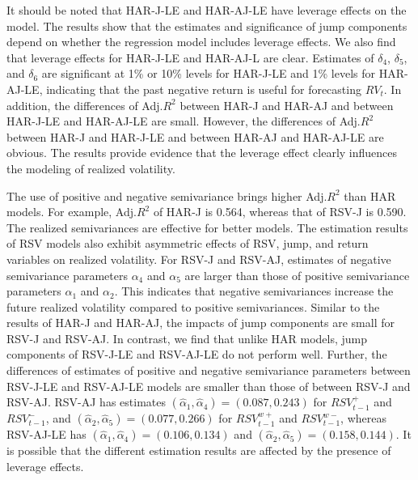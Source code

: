 \documentclass[10pt]{article}
\begin{document}
It should be noted that HAR-J-LE and HAR-AJ-LE have leverage effects on the model.
The results show that the estimates and significance of jump components depend on whether the regression model includes leverage effects.   
We also find that leverage effects for HAR-J-LE and HAR-AJ-L are clear.   
Estimates of $\delta_4$, $\delta_5$, and $\delta_6$ are significant at 1\% or 10\% levels for HAR-J-LE and 1\% levels for HAR-AJ-LE, 
indicating that the past negative return is useful for forecasting $RV_t$. 
In addition, the differences of Adj.$R^2$ between HAR-J and HAR-AJ and between HAR-J-LE and HAR-AJ-LE are small. 
However, the differences of Adj.$R^2$ between HAR-J and HAR-J-LE and between HAR-AJ and HAR-AJ-LE are obvious. 
The results provide evidence that the leverage effect clearly influences the modeling of realized volatility.  

The use of positive and negative semivariance brings higher Adj.$R^2$ than HAR models. 
For example, Adj.$R^2$ of HAR-J is 0.564, whereas that of RSV-J is 0.590. 
The realized semivariances are effective for better models. 
The estimation results of RSV models also exhibit asymmetric effects of RSV, jump, and return variables on realized volatility. 
For RSV-J and RSV-AJ, estimates of negative semivariance parameters $\alpha_4$ and $\alpha_5$ are larger than those of positive semivariance parameters $\alpha_1$ and $\alpha_2$.  
This indicates that negative semivariances increase the future realized volatility compared to positive semivariances. 
Similar to the results of  HAR-J and HAR-AJ, the impacts of jump components are small for RSV-J and RSV-AJ.  
In contrast, we find that unlike HAR models, jump components of RSV-J-LE and RSV-AJ-LE do not perform well. 
Further, the differences of estimates of positive and negative semivariance parameters between RSV-J-LE and RSV-AJ-LE models are smaller than those of between RSV-J and RSV-AJ. 
RSV-AJ has estimates $(\hat{\alpha}_1,\hat{\alpha}_4)=(0.087, 0.243)$ for $RSV_{t-1}^{+}$ and $RSV_{t-1}^{-}$, and $(\hat{\alpha}_2,\hat{\alpha}_5)=(0.077, 0.266)$ for $RSV_{t-1}^{w+}$ and $RSV_{t-1}^{w-}$, 
whereas RSV-AJ-LE has $(\hat{\alpha}_1,\hat{\alpha}_4)=(0.106, 0.134)$ and $(\hat{\alpha}_2,\hat{\alpha}_5)=(0.158, 0.144)$. 
It is possible that the different estimation results are affected by the presence of leverage effects.
\end{document}
